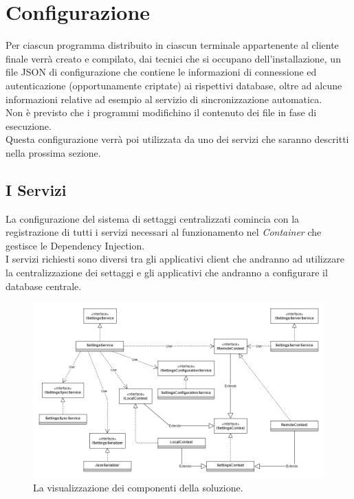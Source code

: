 \documentclass[\main/tesi.tex]{subfiles}
\begin{document}
\section{Configurazione}

Per ciascun programma distribuito in ciascun terminale appartenente al cliente finale verrà creato e compilato, dai tecnici che si occupano dell'installazione, un file JSON di configurazione che contiene le informazioni di connessione ed autenticazione (opportunamente criptate) ai rispettivi database, oltre ad alcune informazioni relative ad esempio al servizio di sincronizzazione automatica.\\
Non è previsto che i programmi modifichino il contenuto dei file in fase di esecuzione.\\
Questa configurazione verrà poi utilizzata da uno dei servizi che saranno descritti nella prossima sezione.\\

\subsection{I Servizi}
La configurazione del sistema di settaggi centralizzati comincia con la registrazione di tutti i servizi necessari al funzionamento nel \textit{Container} che gestisce le Dependency Injection.\\
I servizi richiesti sono diversi tra gli applicativi client che andranno ad utilizzare la centralizzazione dei settaggi e gli applicativi che andranno a configurare il database centrale.\\

\begin{figure}[h]
    \caption{La visualizzazione dei componenti della soluzione.}
    \includegraphics[width=\textwidth]{../images/components.png}
\end{figure}
\end{document}
